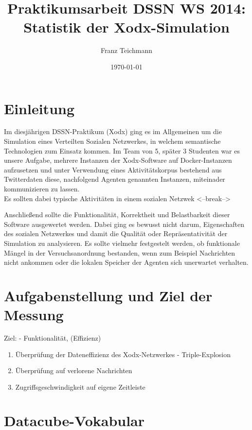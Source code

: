 \documentclass{article}
\title{Praktikumsarbeit DSSN WS 2014: \\ Statistik der Xodx-Simulation}
\author{Franz Teichmann}
\date{\today}
\begin{document}
\maketitle

\tableofcontents
\newpage

\section{Einleitung}

Im diesjährigen DSSN-Praktikum (Xodx) ging es im Allgemeinen um die Simulation eines Verteilten Sozialen Netzwerkes, in welchem semantische Technologien zum Einsatz kommen. Im Team von 5, später 3 Studenten war es unsere Aufgabe, mehrere Instanzen der Xodx-Software auf Docker-Instanzen aufzusetzen und unter Verwendung eines Aktivitätskorpus bestehend aus Twitterdaten diese, nachfolgend Agenten genannten Instanzen, miteinader kommunizieren zu lassen. \\
Es sollten dabei typische Aktivitäten in einem sozialen Netzwek <--break-->



Anschließend sollte die Funktionalität, Korrektheit und Belastbarkeit dieser Software ausgewertet werden. Dabei ging es bewusst nicht darum, Eigenschaften des sozialen Netzwerkes und damit die Qualität oder Repräsentativität der Simulation zu analysieren. Es sollte vielmehr festgestelt werden, ob funktionale Mängel in der Versuchsanordnung bestanden, wenn zum Beispiel Nachrichten nicht ankommen oder die lokalen Speicher der Agenten sich unerwartet verhalten.

\section{Aufgabenstellung und Ziel der Messung}

Ziel: - Funktionalität, (Effizienz)
\begin{enumerate}
    \item{Überprüfung der Dateneffizienz des Xodx-Netzwerkes - Triple-Explosion}
    \item{Überprüfung auf verlorene Nachrichten}
    \item{Zugriffsgeschwindigkeit auf eigene Zeitleiste}
\end{enumerate}


\section{Datacube-Vokabular}
\end{document}
